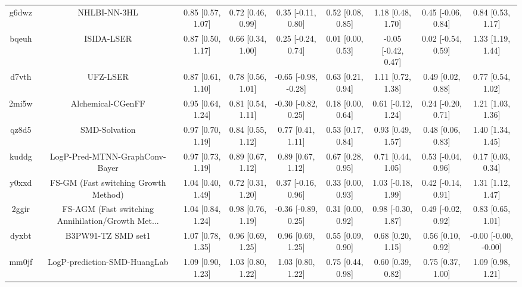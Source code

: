 \documentclass{article}
\begin{document}
\begin{center}
\begin{longtable}{|ccccccccc|}
 g6dwz &                                       NHLBI-NN-3HL &  0.85 [0.57, 1.07] &  0.72 [0.46, 0.99] &    0.35 [-0.11, 0.80] &  0.52 [0.08, 0.85] &    1.18 [0.48, 1.70] &   0.45 [-0.06, 0.84] &     0.84 [0.53, 1.17] \\
 bqeuh &                                         ISIDA-LSER &  0.87 [0.50, 1.17] &  0.66 [0.34, 1.00] &    0.25 [-0.24, 0.74] &  0.01 [0.00, 0.53] &  -0.05 [-0.42, 0.47] &   0.02 [-0.54, 0.59] &     1.33 [1.19, 1.44] \\
 d7vth &                                           UFZ-LSER &  0.87 [0.61, 1.10] &  0.78 [0.56, 1.01] &  -0.65 [-0.98, -0.28] &  0.63 [0.21, 0.94] &    1.11 [0.72, 1.38] &    0.49 [0.02, 0.88] &     0.77 [0.54, 1.02] \\
 2mi5w &                                  Alchemical-CGenFF &  0.95 [0.64, 1.24] &  0.81 [0.54, 1.11] &   -0.30 [-0.82, 0.25] &  0.18 [0.00, 0.64] &   0.61 [-0.12, 1.24] &   0.24 [-0.20, 0.71] &     1.21 [1.03, 1.36] \\
 qz8d5 &                                      SMD-Solvation &  0.97 [0.70, 1.19] &  0.84 [0.55, 1.12] &     0.77 [0.41, 1.11] &  0.53 [0.17, 0.84] &    0.93 [0.49, 1.57] &    0.48 [0.06, 0.83] &     1.40 [1.34, 1.45] \\
 kuddg &                     LogP-Pred-MTNN-GraphConv-Bayer &  0.97 [0.73, 1.19] &  0.89 [0.67, 1.12] &     0.89 [0.67, 1.12] &  0.67 [0.28, 0.95] &    0.71 [0.44, 1.05] &   0.53 [-0.04, 0.96] &     0.17 [0.03, 0.34] \\
 y0xxd &               FS-GM (Fast switching Growth Method) &  1.04 [0.40, 1.49] &  0.72 [0.31, 1.20] &    0.37 [-0.16, 0.96] &  0.33 [0.00, 0.93] &   1.03 [-0.18, 1.99] &   0.42 [-0.14, 0.91] &     1.31 [1.12, 1.47] \\
 2ggir &  FS-AGM (Fast switching Annihilation/Growth Met... &  1.04 [0.84, 1.24] &  0.98 [0.76, 1.19] &   -0.36 [-0.89, 0.25] &  0.31 [0.00, 0.92] &   0.98 [-0.30, 1.87] &   0.49 [-0.02, 0.92] &     0.83 [0.65, 1.01] \\
 dyxbt &                                 B3PW91-TZ SMD set1 &  1.07 [0.78, 1.35] &  0.96 [0.69, 1.25] &     0.96 [0.69, 1.25] &  0.55 [0.09, 0.90] &    0.68 [0.20, 1.15] &    0.56 [0.10, 0.92] &  -0.00 [-0.00, -0.00] \\
 mm0jf &                       LogP-prediction-SMD-HuangLab &  1.09 [0.90, 1.23] &  1.03 [0.80, 1.22] &     1.03 [0.80, 1.22] &  0.75 [0.44, 0.98] &    0.60 [0.39, 0.82] &    0.75 [0.37, 1.00] &     1.09 [0.98, 1.21] \\

\end{longtable}
\end{center}
\end{document}
